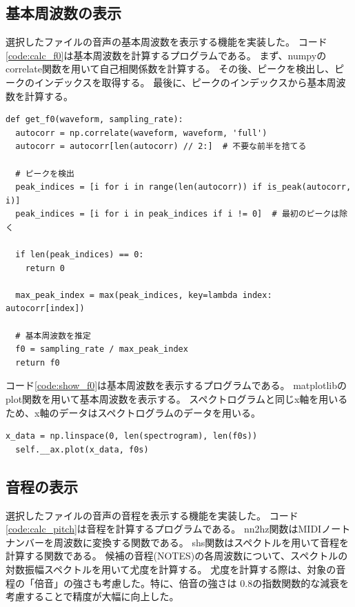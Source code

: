 \documentclass[a4paper,11pt]{jsarticle}
\begin{document}
\subsection{基本周波数の表示}
選択したファイルの音声の基本周波数を表示する機能を実装した。
コード\ref{code:calc_f0}は基本周波数を計算するプログラムである。
まず、numpyのcorrelate関数を用いて自己相関係数を計算する。
その後、ピークを検出し、ピークのインデックスを取得する。
最後に、ピークのインデックスから基本周波数を計算する。

\begin{lstlisting}[caption=基本周波数計算,label=code:calc_f0]
def get_f0(waveform, sampling_rate):
  autocorr = np.correlate(waveform, waveform, 'full')
  autocorr = autocorr[len(autocorr) // 2:]  # 不要な前半を捨てる

  # ピークを検出
  peak_indices = [i for i in range(len(autocorr)) if is_peak(autocorr, i)]
  peak_indices = [i for i in peak_indices if i != 0]  # 最初のピークは除く

  if len(peak_indices) == 0:
    return 0

  max_peak_index = max(peak_indices, key=lambda index: autocorr[index])

  # 基本周波数を推定
  f0 = sampling_rate / max_peak_index
  return f0
\end{lstlisting}

コード\ref{code:show_f0}は基本周波数を表示するプログラムである。
matplotlibのplot関数を用いて基本周波数を表示する。
スペクトログラムと同じx軸を用いるため、x軸のデータはスペクトログラムのデータを用いる。

\begin{lstlisting}[caption=基本周波数表示,label=code:show_f0]
  x_data = np.linspace(0, len(spectrogram), len(f0s))
  self.__ax.plot(x_data, f0s)
\end{lstlisting}

\subsection{音程の表示}
選択したファイルの音声の音程を表示する機能を実装した。
コード\ref{code:calc_pitch}は音程を計算するプログラムである。
nn2hz関数はMIDIノートナンバーを周波数に変換する関数である。
shs関数はスペクトルを用いて音程を計算する関数である。
候補の音程(NOTES)の各周波数について、スペクトルの対数振幅スペクトルを用いて尤度を計算する。
尤度を計算する際は、対象の音程の「倍音」の強さも考慮した。特に、倍音の強さは
0.8の指数関数的な減衰を考慮することで精度が大幅に向上した。
\end{document}
